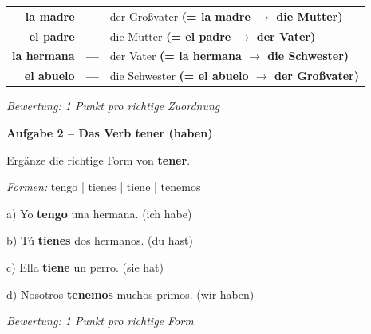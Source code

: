 \documentclass[11pt, a4paper]{article}
\newcommand{\fachfarbe}{spanisch}
\newcommand{\punktebox}[1]{\hfill\fbox{\small \_/#1}}
\newcommand{\loesung}[1]{\textcolor{loesung}{\textbf{#1}}}
\newenvironment{aufgabe}[1]{%
    \needspace{5\baselineskip}%
    \nopagebreak[4]%
    \vspace{10pt}
    \noindent\textbf{\textcolor{\fachfarbe}{Aufgabe #1}}
    \nopagebreak[4]%
    \vspace{5pt}
    \nopagebreak[4]%
    \begin{list}{}{\leftmargin=0pt}
    \item[]
}{%
    \end{list}
}
\newcommand{\es}[1]{\textcolor{\fachfarbe}{\textbf{#1}}}
\begin{document}
\begin{center}
\begin{tabular}{rcl}
\es{la madre} & \loesung{---} & der Großvater \loesung{(= la madre $\rightarrow$ die Mutter)} \\[0.8em]
\es{el padre} & \loesung{---} & die Mutter \loesung{(= el padre $\rightarrow$ der Vater)} \\[0.8em]
\es{la hermana} & \loesung{---} & der Vater \loesung{(= la hermana $\rightarrow$ die Schwester)} \\[0.8em]
\es{el abuelo} & \loesung{---} & die Schwester \loesung{(= el abuelo $\rightarrow$ der Großvater)} \\
\end{tabular}
\end{center}

\textit{\textcolor{grau}{Bewertung: 1 Punkt pro richtige Zuordnung}}

\vspace{15pt}


\begin{aufgabe}{2 -- Das Verb \es{tener} (haben)}
Ergänze die richtige Form von \es{tener}. \punktebox{4}
\end{aufgabe}

\begin{vokabelkasten}
\textit{Formen:} tengo | tienes | tiene | tenemos
\end{vokabelkasten}

\vspace{0.5em}

\noindent
a) Yo \loesung{tengo} una hermana. \hfill (ich habe)

\vspace{0.8em}

\noindent
b) Tú \loesung{tienes} dos hermanos. \hfill (du hast)

\vspace{0.8em}

\noindent
c) Ella \loesung{tiene} un perro. \hfill (sie hat)

\vspace{0.8em}

\noindent
d) Nosotros \loesung{tenemos} muchos primos. \hfill (wir haben)

\textit{\textcolor{grau}{Bewertung: 1 Punkt pro richtige Form}}
\end{document}
